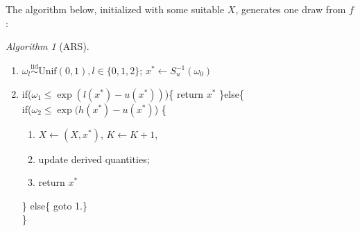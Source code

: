 \documentclass[11pt]{article}
\newcommand{\upperlog}{u}
\newcommand{\cumulproposal}{S}
\newcommand{\arsmaxindex}{K}
\begin{document}
The algorithm below, initialized with some suitable $X$, generates one draw from $f$:
\theoremstyle{remark}
\newtheorem{algorithm}{Algorithm}
\begin{algorithm}[ARS]\label{alg:ARS}
\hfill\par
\begin{enumerate}
\item $\omega_l \stackrel{\mathrm{iid}}{\sim}\mathrm{Unif}(0,1),l\in\{0,1,2\}$; $x^*\leftarrow \cumulproposal_\upperlog^{-1}(\omega_0)$
\item if($\omega_1\leq \exp(l(x^*)-u(x^*))$)\{ return $x^*$ \}else\{\\
 if($\omega_2\leq \exp(h(x^*)-u(x^*)$)
\{ \begin{enumerate}
\item $X\leftarrow (X,x^*)$, $\arsmaxindex\leftarrow \arsmaxindex+1$, \item update derived quantities; \item return $x^*$
\end{enumerate}\}
else\{ goto 1.\}\\
\}
\end{enumerate}
\end{algorithm}




\end{document}
